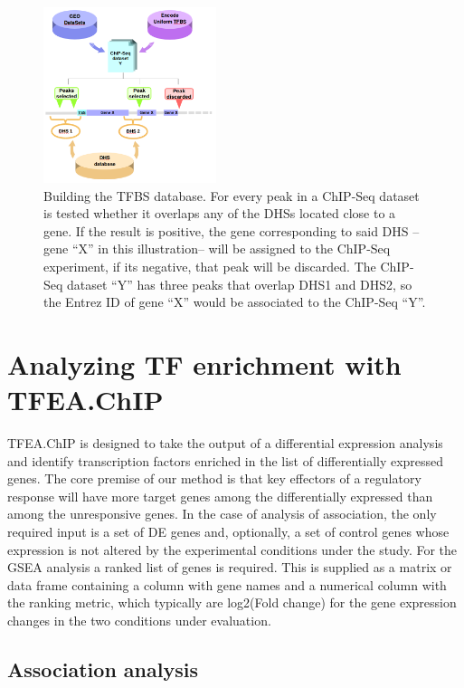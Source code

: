 \documentclass[a4paper, 12pt ]{article}
\begin{document}
\begin{figure}
	\centering
	\includegraphics[width=0.45\textwidth]{graf-TFBS_building}
	\caption{Building the TFBS database. For every peak in a ChIP-Seq dataset is tested whether it overlaps any of the DHSs located close to a gene. If the result is positive, the gene corresponding to said DHS –gene “X” in this illustration– will be assigned to the ChIP-Seq experiment, if its negative, that peak will be discarded.
	The ChIP-Seq dataset “Y” has three peaks that overlap DHS1 and DHS2, so the Entrez ID of gene “X” would be associated to the ChIP-Seq “Y”.}
\end{figure}

\section{Analyzing TF enrichment with TFEA.ChIP}

TFEA.ChIP is designed to take the output of a differential expression analysis and identify transcription factors enriched in the list of differentially expressed genes. The core premise of our method is that key effectors of a regulatory response will have more target genes among the differentially expressed than among the unresponsive genes.
In the case of analysis of association, the only required input is a set of DE genes and, optionally, a set of control genes whose expression is not altered by the experimental conditions under the study. 
For the GSEA analysis a ranked list of genes is required. This is supplied as a matrix or data frame containing a column with gene names and a numerical column with the ranking metric, which typically are log2(Fold change) for the gene expression changes in the two conditions under evaluation. 

\subsection{Association analysis}
\end{document}
